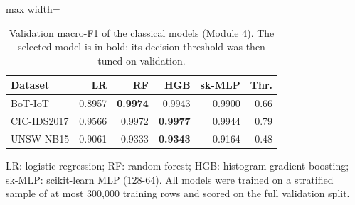 \begin{table}[t]
\centering
\caption{Validation macro-F1 of the classical models (Module 4). The selected model is in bold; its decision threshold was then tuned on validation.}
\label{tab:validation}
\footnotesize
\setlength{\tabcolsep}{3.5pt}
\begin{adjustbox}{max width=\linewidth}
\begin{tabular}{lrrrrr}
\toprule
Dataset & LR & RF & HGB & sk-MLP & Thr. \\
\midrule
BoT-IoT & 0.8957 & \textbf{0.9974} & 0.9943 & 0.9900 & 0.66 \\
CIC-IDS2017 & 0.9566 & 0.9972 & \textbf{0.9977} & 0.9944 & 0.79 \\
UNSW-NB15 & 0.9061 & 0.9333 & \textbf{0.9343} & 0.9164 & 0.48 \\
\bottomrule
\end{tabular}
\end{adjustbox}
\par\vspace{2pt}
\parbox{0.98\linewidth}{\scriptsize LR: logistic regression; RF: random forest; HGB: histogram gradient boosting; sk-MLP: scikit-learn MLP (128-64). All models were trained on a stratified sample of at most 300,000 training rows and scored on the full validation split.}
\end{table}
